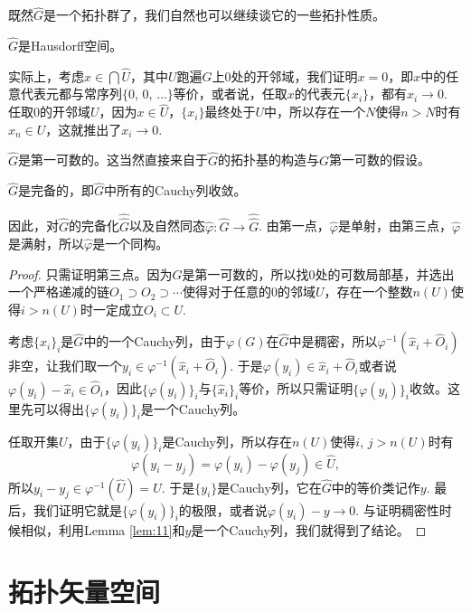 \begin{para}
	既然$\hat{G}$是一个拓扑群了，我们自然也可以继续谈它的一些拓扑性质。
	\begin{compactenum}
	\item $\hat{G}$是Hausdorff空间。

		实际上，考虑$x\in \bigcap\hat{U}$，其中$U$跑遍$G$上$0$处的开邻域，我们证明$x=0$，即$x$中的任意代表元都与常序列$\{0$, $0$, $\dots\}$等价，或者说，任取$x$的代表元$\{x_i\}$，都有$x_i\to 0$. 任取$0$的开邻域$U$，因为$x\in \hat{U}$，$\{x_i\}$最终处于$U$中，所以存在一个$N$使得$n>N$时有$x_n\in U$，这就推出了$x_i\to 0$.
	\item $\hat{G}$是第一可数的。这当然直接来自于$\hat{G}$的拓扑基的构造与$G$第一可数的假设。

	\item $\hat{G}$是完备的，即$\hat{G}$中所有的Cauchy列收敛。
	\item 因此，对$\hat{G}$的完备化$\hat{\hat G}$以及自然同态$\hat\varphi:\hat{G}\to\hat{\hat G}$. 由第一点，$\hat\varphi$是单射，由第三点，$\hat\varphi$是满射，所以$\hat\varphi$是一个同构。
	\end{compactenum}

	\begin{proof}
		只需证明第三点。因为$G$是第一可数的，所以找$0$处的可数局部基，并选出一个严格递减的链$O_1\supset O_2\supset \cdots$使得对于任意的$0$的邻域$U$，存在一个整数$n(U)$使得$i>n(U)$时一定成立$O_i\subset U$. 

		考虑$\{\hat{x}_i\}_i$是$\hat{G}$中的一个Cauchy列，由于$\varphi(G)$在$\hat{G}$中是稠密，所以$\varphi^{-1}(\hat{x}_i+\hat{O}_i)$非空，让我们取一个$y_i\in\varphi^{-1}(\hat{x}_i+\hat{O}_i)$. 于是$\varphi(y_i)\in \hat{x}_i+\hat{O}_i$或者说$\varphi(y_i)-\hat{x}_i\in \hat{O}_i$，因此$\{\varphi(y_i)\}_i$与$\{\hat{x}_i\}_i$等价，所以只需证明$\{\varphi(y_i)\}_i$收敛。这里先可以得出$\{\varphi(y_i)\}_i$是一个Cauchy列。

		任取开集$U$，由于$\{\varphi(y_i)\}_i$是Cauchy列，所以存在$n(U)$使得$i$, $j>n(U)$时有
		\[
		\varphi(y_i-y_j)=\varphi(y_i)-\varphi(y_j)\in \hat{U},
		\]
		所以$y_i-y_j\in \varphi^{-1}(\hat{U})=U$. 于是$\{y_i\}$是Cauchy列，它在$\hat G$中的等价类记作$y$. 最后，我们证明它就是$\{\varphi(y_i)\}_i$的极限，或者说$\varphi(y_i)-y\to 0$. 与证明稠密性时候相似，利用Lemma \ref{lem:11}和$y$是一个Cauchy列，我们就得到了结论。
	\end{proof}
\end{para}


\chapter{拓扑矢量空间}

